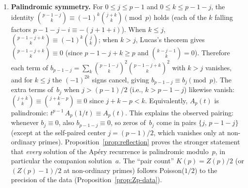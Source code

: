 \documentclass[11pt]{article}
\theoremstyle{definition}
\theoremstyle{remark}
\begin{document}
\begin{enumerate}
\item \textbf{Palindromic symmetry.}
For $0 \le j \le p-1$ and $0 \le k \le p-1-j$,
the identity
$\binom{p{-}1{-}j}{k} \equiv (-1)^k \binom{j+k}{k}
\pmod{p}$ holds (each of the $k$ falling factors
$p{-}1{-}j{-}i \equiv -(j{+}1{+}i)$).
When $k \le j$,
$\binom{p{-}1{-}j{+}k}{k} \equiv (-1)^k \binom{j}{k}$;
when $k > j$, Lucas's theorem gives
$\binom{p{-}1{-}j{+}k}{k} \equiv 0$ (since
$p{-}1{-}j{+}k \ge p$ and
$\binom{k{-}j{-}1}{k} = 0$).
Therefore each term of
$b_{p-1-j} = \sum_{k} \binom{p{-}1{-}j}{k}^2
\binom{p{-}1{-}j{+}k}{k}^2$ with $k > j$ vanishes,
and for $k \le j$ the $(-1)^{2k}$ signs cancel,
giving $b_{p-1-j} \equiv b_j \pmod{p}$.
The extra terms of~$b_j$ when $j > (p{-}1)/2$
(i.e., $k > p{-}1{-}j$) likewise vanish:
$\binom{j{+}k}{k} \equiv \binom{j{+}k{-}p}{k}
\equiv 0$ since $j{+}k{-}p < k$.
Equivalently, $A_p(t)$ is palindromic:
$t^{p-1}\, A_p(1/t) \equiv A_p(t)$.
This explains the observed pairing:
whenever $b_j \equiv 0$, also
$b_{p-1-j} \equiv 0$, so zeros of~$b_j$
come in pairs $\{j,\, p-1-j\}$ (except
at the self-paired center $j = (p-1)/2$,
which vanishes only at non-ordinary primes).
Proposition~\ref{prop:reflection} proves the
stronger statement that \emph{every} solution
of the Ap\'ery recurrence is palindromic
modulo~$p$, in particular the companion solution~$a$.
The ``pair count'' $K(p) = Z(p)/2$
(or $(Z(p)-1)/2$ at non-ordinary primes)
follows Poisson($1/2$) to the
precision of the data (Proposition~\ref{prop:Zp-data}).


\end{enumerate}
\end{document}

